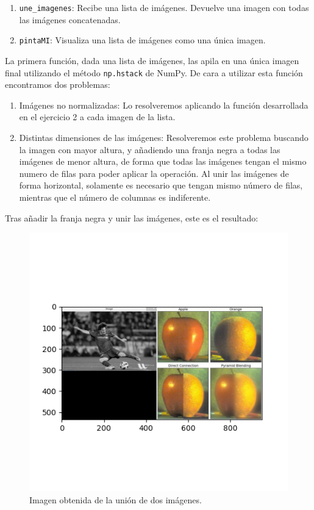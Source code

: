 \documentclass[12pt, spanish]{article}
\begin{document}
\begin{enumerate}
	\item \texttt{une\_imagenes}: Recibe una lista de imágenes. Devuelve una imagen con todas las imágenes concatenadas.
	\item \texttt{pintaMI}: Visualiza una lista de imágenes como una única imagen.
\end{enumerate}

La primera función, dada una lista de imágenes, las apila en una única imagen final utilizando el método \texttt{np.hstack}\cite{hstack} de NumPy. De cara a utilizar esta función encontramos dos problemas:

\begin{enumerate}
	\item Imágenes no normalizadas: Lo resolveremos aplicando la función desarrollada en el ejercicio 2 a cada imagen de la lista.
	\item Distintas dimensiones de las imágenes: Resolveremos este problema buscando la imagen con mayor altura, y añadiendo una franja negra a todas las imágenes de menor altura, de forma que todas las imágenes tengan el mismo numero de filas para poder aplicar la operación. Al unir las imágenes de forma horizontal, solamente es necesario que tengan mismo número de filas, mientras que el número de columnas es indiferente.
\end{enumerate}

Tras añadir la franja negra y unir las imágenes, este es el resultado:

\begin{figure}[H]
	\centering
	\includegraphics[scale = 1]{union.png}
	\caption{Imagen obtenida de la unión de dos imágenes.}
	\label{fig:ej3}
	
\end{figure}
\end{document}
